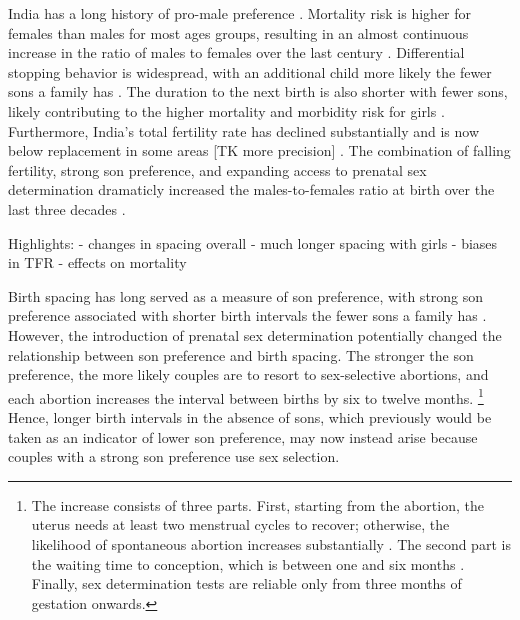 \documentclass[12pt,letterpaper]{article}
\begin{document}
India has a long history of pro-male preference \citep{Kishor1993,murthi95,arnold98}.
Mortality risk is higher for females than males for most ages groups, resulting in
an almost continuous increase in the ratio of males to females over the last century
 \citep{dyson01,Navaneetham2011,Bongaarts2015}.
Differential stopping behavior is widespread, with an additional child more likely the
fewer sons a family has 
\citep{repetto72,Das1987,Arnold1997,arnold98,clark00,Basu2010,Barcellos2014}.
The duration to the next birth is also shorter with fewer sons, likely contributing
to the higher mortality and morbidity risk for girls
\citep{Whitworth2002,Bhargava2003,Rutstein2005,Bhalotra2008,Maitra2008,Makepeace2008,
Jayachandran2011,Kumar2016,Jayachandran2017a,Ghosh2018}.
Furthermore, India's total fertility rate has declined substantially and is now below 
replacement in some areas [TK more precision] 
\citep{Guilmoto2013,Dharmalingam2014,International-Institute-for-Population-Sciences-IIPS2017}.
The combination of falling fertility, strong son preference, and expanding access to 
prenatal sex determination dramaticly increased the males-to-females ratio at 
birth over the last three decades
\citep{das_gupta97,Sudha1999,Arnold2002,retherford03b,jha06,Guilmoto2009a,Guilmoto2012,
Bongaarts2013,Portner2015b,Jayachandran2017}.



Highlights:
- changes in spacing overall
- much longer spacing with girls
- biases in TFR
- effects on mortality




Birth spacing has long served as a measure of son preference, with strong
son preference associated with shorter birth intervals the
fewer sons a family has \citep{ben-porath76b,Leung1988}.
However, the introduction of prenatal sex determination potentially 
changed the relationship between son preference and birth spacing.
The stronger the son preference, the more likely couples are to resort to sex-selective 
abortions, and each abortion increases the interval between births by six to twelve 
months.%
\footnote{
The increase consists of three parts.
First, starting from the abortion, the uterus needs at 
least two menstrual cycles to recover;  otherwise, the likelihood 
of spontaneous abortion increases substantially \citep{zhou00b}.
The second part is the waiting time to conception, which is between 
one and six months \citep{Wang2003}.
Finally, sex determination tests are reliable only from three months 
of gestation onwards.
}
Hence, longer birth intervals in the absence of sons, which previously would be taken as 
an indicator of lower son preference, may now instead arise because couples with a strong 
son preference use sex selection.
\end{document}
